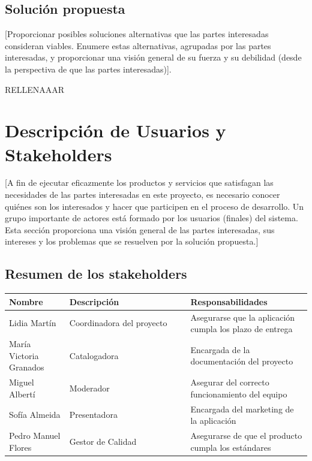 \documentclass[11pt]{article}
\begin{document}
\subsection{Solución propuesta}
[Proporcionar posibles soluciones alternativas que las partes interesadas consideran viables. Enumere estas alternativas, agrupadas por las partes interesadas, y proporcionar una visión general de su fuerza y su debilidad (desde la perspectiva de que las partes interesadas)].

RELLENAAAR

\newpage

\section{Descripción de Usuarios y Stakeholders}
[A fin de ejecutar eficazmente los productos y servicios que satisfagan las necesidades de las partes interesadas en este proyecto, es necesario conocer quiénes son los interesados y hacer que participen en el proceso de desarrollo. Un grupo importante de actores está formado por los usuarios (finales) del sistema.
Esta sección proporciona una visión general de las partes interesadas, sus intereses y los problemas que se resuelven por la solución propuesta.]

\subsection{Resumen de los stakeholders}
\begin{table}[H]
  \centering
  \begin{tabular}{p{0.2\linewidth}p{0.4\linewidth}p{0.4\linewidth}}
    \toprule
    \textbf{Nombre} & \textbf{Descripción} & \textbf{Responsabilidades} \\
    \midrule
    Lidia Martín & Coordinadora del proyecto & Asegurarse que la aplicación cumpla los plazo de entrega\\
    María Victoria Granados & Catalogadora & Encargada de la documentación del proyecto\\
    Miguel Albertí & Moderador & Asegurar del correcto funcionamiento del equipo\\
    Sofía Almeida & Presentadora & Encargada del marketing de la aplicación\\
    Pedro Manuel Flores & Gestor de Calidad & Asegurarse de que el producto cumpla los estándares\\
    \bottomrule
  \end{tabular}
\end{table}
\end{document}

